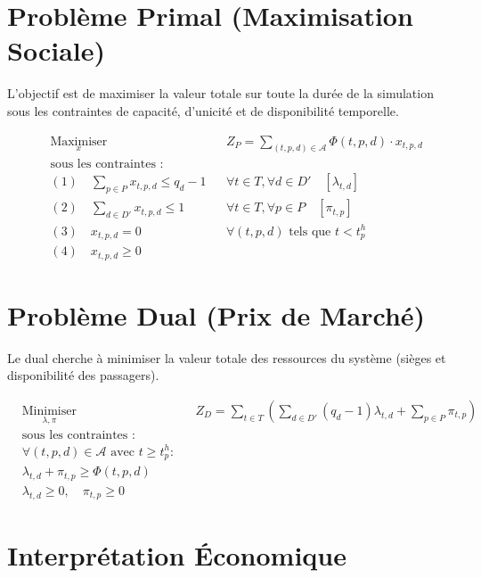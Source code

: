 \documentclass[12pt]{article}
\begin{document}
\section{Problème Primal (Maximisation Sociale)}

L'objectif est de maximiser la valeur totale sur toute la durée de la simulation sous les contraintes de capacité, d'unicité et de disponibilité temporelle.

\begin{equation*}
\begin{aligned}
& \underset{x}{\text{Maximiser}} && Z_P = \sum_{(t,p,d) \in \mathcal{A}} \Phi(t, p, d) \cdot x_{t,p,d} \\
& \text{sous les contraintes :} && \\
& (1) \quad \sum_{p \in P} x_{t,p,d} \leq q_d - 1 && \forall t \in T, \forall d \in D' \quad [\lambda_{t,d}] \\
& (2) \quad \sum_{d \in D'} x_{t,p,d} \leq 1 && \forall t \in T, \forall p \in P \quad [\pi_{t,p}] \\
& (3) \quad x_{t,p,d} = 0 && \forall (t,p,d) \text{ tels que } t < t_p^h \\
& (4) \quad x_{t,p,d} \geq 0 &&
\end{aligned}
\end{equation*}

\section{Problème Dual (Prix de Marché)}

Le dual cherche à minimiser la valeur totale des ressources du système (sièges et disponibilité des passagers).

\begin{equation*}
\begin{aligned}
& \underset{\lambda, \pi}{\text{Minimiser}} && Z_D = \sum_{t \in T} \left( \sum_{d \in D'} (q_d - 1) \lambda_{t,d} + \sum_{p \in P} \pi_{t,p} \right) \\
& \text{sous les contraintes :} && \\
& \forall (t, p, d) \in \mathcal{A} \text{ avec } t \geq t_p^h : && \\
& \lambda_{t,d} + \pi_{t,p} \geq \Phi(t, p, d) \\
& \lambda_{t,d} \geq 0, \quad \pi_{t,p} \geq 0
\end{aligned}
\end{equation*}

\section{Interprétation Économique}
\end{document}
